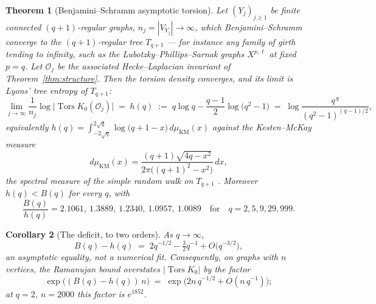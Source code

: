 \documentclass[11pt]{amsart}
\numberwithin{equation}{section}
\newtheorem{theorem}{Theorem}[section]
\newtheorem{corollary}[theorem]{Corollary}
\theoremstyle{definition}
\theoremstyle{remark}
\newcommand{\cO}{\mathcal{O}}
\newcommand{\Tors}{\operatorname{Tors}}
\begin{document}
\begin{theorem}[Benjamini--Schramm asymptotic torsion]\label{thm:bstorsion}
Let $(Y_j)_{j\ge1}$ be finite connected $(q+1)$-regular graphs, $n_j=|V_{Y_j}|\to\infty$,
which Benjamini--Schramm converge to the $(q+1)$-regular tree $T_{q+1}$ --- for instance
any family of girth tending to infinity, such as the Lubotzky--Phillips--Sarnak graphs
$X^{p,\ell}$ at fixed $p=q$. Let $\cO_j$ be the associated Hecke--Laplacian invariant of
Theorem~\ref{thm:structure}. Then the torsion density converges, and its limit is Lyons'
tree entropy of $T_{q+1}$:
\begin{equation}\label{eq:bslimit}
\lim_{j\to\infty}\frac1{n_j}\log\bigl|\Tors K_0(\cO_j)\bigr|
\;=\;h(q)\;:=\;q\log q-\frac{q-1}{2}\log\bigl(q^2-1\bigr)
\;=\;\log\frac{q^{\,q}}{(q^2-1)^{(q-1)/2}} ,
\end{equation}
equivalently $h(q)=\int_{-2\sqrt q}^{2\sqrt q}\log\bigl(q+1-x\bigr)\,d\mu_{\mathrm{KM}}(x)$
against the Kesten--McKay measure
\[
d\mu_{\mathrm{KM}}(x)=\frac{(q+1)\sqrt{4q-x^2}}{2\pi\bigl((q+1)^2-x^2\bigr)}\,dx ,
\]
the spectral measure of the simple random walk on $T_{q+1}$ \cite{Kesten1959,McKay1981}.
Moreover $h(q)<B(q)$ for every $q$, with
\[
\frac{B(q)}{h(q)}=2.1061,\ 1.3889,\ 1.2340,\ 1.0957,\ 1.0089
\quad\text{for}\quad q=2,5,9,29,999.
\]
\end{theorem}

\begin{corollary}[The deficit, to two orders]\label{cor:deficit}
As $q\to\infty$,
\begin{equation}\label{eq:deficit}
B(q)-h(q)\;=\;2q^{-1/2}-\tfrac32q^{-1}+O\bigl(q^{-3/2}\bigr) ,
\end{equation}
an asymptotic equality, not a numerical fit. Consequently, on graphs with $n$
vertices, the Ramanujan bound overstates $|\Tors K_0|$ by the factor
\[
\exp\bigl((B(q)-h(q))\,n\bigr)
\;=\;
\exp\bigl(2n\,q^{-1/2}+O(n\,q^{-1})\bigr) ;
\]
at $q=2$, $n=2000$ this factor is $e^{1852}$.
\end{corollary}
\end{document}
